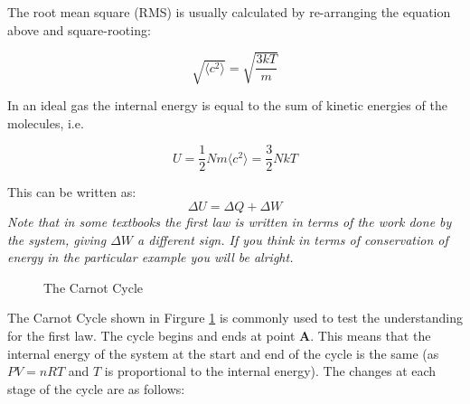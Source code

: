 \documentclass[main.tex]{subfiles}
\begin{document}

The root mean square (RMS) is usually calculated by re-arranging the equation above and square-rooting:

$$ \sqrt{\langle c^2 \rangle} = \sqrt{\frac{3kT}{m}} $$


In an ideal gas the internal energy is equal to the sum of kinetic energies of the molecules, i.e.

$$ U = \frac{1}{2}Nm\langle c^2 \rangle = \frac{3}{2}NkT $$


This can be written as:
$$ \Delta U = \Delta Q + \Delta W $$
\emph{Note that in some textbooks the first law is written in terms of the work done \emph{by} the system, giving $\Delta W$ a different sign. If you think in terms of conservation of energy in the particular example you will be alright.}

\begin{figure}[h]
  \caption{The Carnot Cycle}
  \label{carnotcycle}
\end{figure}

The Carnot Cycle shown in Firgure \ref{carnotcycle} is commonly used to test the understanding for the first law. The cycle begins and ends at point \textbf{A}. This means that the internal energy of the system at the start and end of the cycle is the same (as $PV=nRT$ and $T$ is proportional to the internal energy). The changes at each stage of the cycle are as follows:
\end{document}
